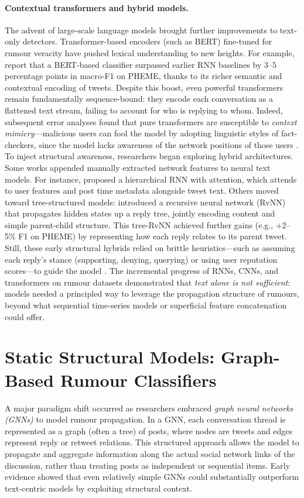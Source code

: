 \documentclass{cshonours}
\begin{document}
\paragraph{Contextual transformers and hybrid models.} The advent of large-scale language models brought further improvements to text-only detectors. Transformer-based encoders (such as BERT) fine-tuned for rumour veracity have pushed lexical understanding to new heights. For example, \cite{liu2025enhancing} report that a BERT-based classifier surpassed earlier RNN baselines by 3–5 percentage points in macro-F1 on PHEME, thanks to its richer semantic and contextual encoding of tweets. Despite this boost, even powerful transformers remain fundamentally sequence-bound: they encode each conversation as a flattened text stream, failing to account for who is replying to whom. Indeed, subsequent error analyses found that pure transformers are susceptible to \emph{context mimicry}—malicious users can fool the model by adopting linguistic styles of fact-checkers, since the model lacks awareness of the network positions of those users \cite{rahman2024primer}. To inject structural awareness, researchers began exploring hybrid architectures. Some works appended manually extracted network features to neural text models. For instance, \cite{guo2018hierarchical} proposed a hierarchical RNN with attention, which attends to user features and post time metadata alongside tweet text. Others moved toward tree-structured models: \cite{ma2018rvnn} introduced a recursive neural network (RvNN) that propagates hidden states up a reply tree, jointly encoding content and simple parent-child structure. This tree-RvNN achieved further gains (e.g., +2–5\% F1 on PHEME) by representing how each reply relates to its parent tweet. Still, these early structural hybrids relied on brittle heuristics—such as assuming each reply’s stance (supporting, denying, querying) or using user reputation scores—to guide the model \cite{lukasik2019stance}. The incremental progress of RNNs, CNNs, and transformers on rumour datasets demonstrated that \emph{text alone is not sufficient}: models needed a principled way to leverage the propagation structure of rumours, beyond what sequential time-series models or superficial feature concatenation could offer.

\section{Static Structural Models: Graph-Based Rumour Classifiers}
A major paradigm shift occurred as researchers embraced \emph{graph neural networks (GNNs)} to model rumour propagation. In a GNN, each conversation thread is represented as a graph (often a tree) of posts, where nodes are tweets and edges represent reply or retweet relations. This structured approach allows the model to propagate and aggregate information along the actual social network links of the discussion, rather than treating posts as independent or sequential items. Early evidence showed that even relatively simple GNNs could substantially outperform text-centric models by exploiting structural context. 
\end{document}
